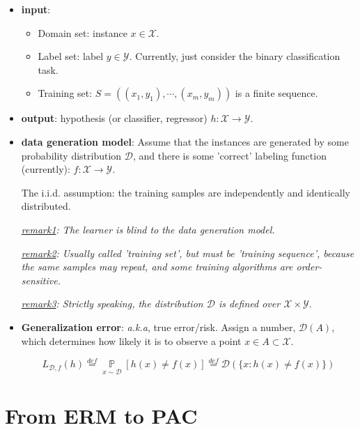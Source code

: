 \documentclass{article}
\begin{document}
\begin{itemize}

	\item \textbf{input}:
	
	\begin{itemize}
	\item Domain set: instance $x \in \mathcal{X}$.
	\item Label set: label $y \in \mathcal{Y}$. Currently, just consider the binary classification task.
	\item Training set: $S=((x_1,y_1),\cdots,(x_m,y_m))$ is a finite sequence.
	\end{itemize}	 

	\item \textbf{output}: hypothesis (or classifier, regressor) $h:\mathcal{X}\rightarrow\mathcal{Y}$.

	\item \textbf{data generation model}: Assume that the instances are generated by some probability distribution $\mathcal{D}$, and there is some 'correct' labeling function (currently): $f:\mathcal{X}\rightarrow\mathcal{Y}$.
	
	The i.i.d. assumption: the training samples are independently and identically distributed.

    \textit{\underline{remark1}: The learner is blind to the data generation model.}

    \textit{\underline{remark2}: Usually called 'training set', but must be 'training sequence', because the same samples may repeat, and some training algorithms are order-sensitive.}
    
    \textit{\underline{remark3}: Strictly speaking, the distribution $\mathcal{D}$ is defined over $\mathcal{X}\times\mathcal{Y}$}.

	\item \textbf{Generalization error}: \textit{a.k.a}, true error/risk. Assign a number, $\mathcal{D}(A)$, which determines how likely it is to observe a point $x \in A \subset \mathcal{X}$.
	
	\begin{equation}
	L_{\mathcal{D},f}(h)\overset{def}{=}\mathop{\mathbb{P}}\limits_{x\sim\mathcal{D}}[h(x)\neq f(x)]\overset{def}{=}\mathcal{D}(\{x:h(x)\neq f(x)\})
	\end{equation}
	
\end{itemize}

\section{From ERM to PAC}
\end{document}
